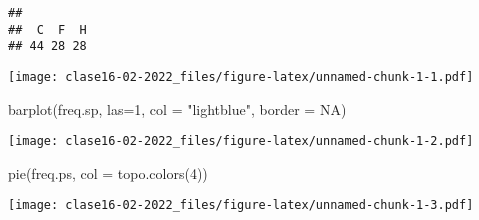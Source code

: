 \documentclass[
]{article}
\newenvironment{Shaded}{\begin{snugshade}}{\end{snugshade}}
\newcommand{\AttributeTok}[1]{\textcolor[rgb]{0.77,0.63,0.00}{#1}}
\newcommand{\ConstantTok}[1]{\textcolor[rgb]{0.00,0.00,0.00}{#1}}
\newcommand{\DecValTok}[1]{\textcolor[rgb]{0.00,0.00,0.81}{#1}}
\newcommand{\FunctionTok}[1]{\textcolor[rgb]{0.00,0.00,0.00}{#1}}
\newcommand{\NormalTok}[1]{#1}
\newcommand{\OtherTok}[1]{\textcolor[rgb]{0.56,0.35,0.01}{#1}}
\newcommand{\SpecialCharTok}[1]{\textcolor[rgb]{0.00,0.00,0.00}{#1}}
\newcommand{\StringTok}[1]{\textcolor[rgb]{0.31,0.60,0.02}{#1}}
\begin{document}
\begin{verbatim}
## 
##  C  F  H 
## 44 28 28
\end{verbatim}

\begin{Shaded}
\end{Shaded}

\texttt{[image: clase16-02-2022\_files/figure-latex/unnamed-chunk-1-1.pdf]}

\begin{Shaded}
\begin{Highlighting}[]
\FunctionTok{barplot}\NormalTok{(freq.sp, }\AttributeTok{las=}\DecValTok{1}\NormalTok{, }\AttributeTok{col =} \StringTok{"lightblue"}\NormalTok{, }\AttributeTok{border =} \ConstantTok{NA}\NormalTok{)}
\end{Highlighting}
\end{Shaded}

\texttt{[image: clase16-02-2022\_files/figure-latex/unnamed-chunk-1-2.pdf]}

\begin{Shaded}
\begin{Highlighting}[]
\FunctionTok{pie}\NormalTok{(freq.ps, }\AttributeTok{col =} \FunctionTok{topo.colors}\NormalTok{(}\DecValTok{4}\NormalTok{))}
\end{Highlighting}
\end{Shaded}

\texttt{[image: clase16-02-2022\_files/figure-latex/unnamed-chunk-1-3.pdf]}

\begin{Shaded}
\end{Shaded}
\end{document}

